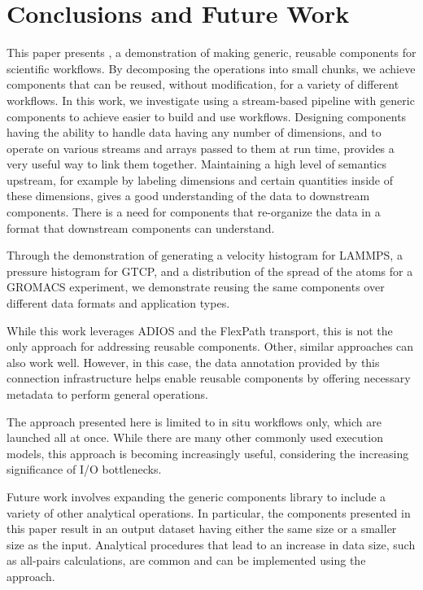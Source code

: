 \section{Conclusions and Future Work}
\label{s:conclusion}

This paper presents \sys, a demonstration of making generic, reusable
components for scientific workflows. By decomposing the operations into small
chunks, we achieve components that can be reused, without modification, for
a variety of different workflows. In this work, we investigate using a
stream-based pipeline with generic components to achieve easier to build and
use workflows. Designing components having the ability to
handle data having any number of dimensions, 
and to operate on various streams and arrays
passed to them at run time,
provides a very useful way to link
them together. Maintaining a high level of semantics upstream, for example by
labeling dimensions and certain quantities inside of these dimensions, gives a
good understanding of the data to downstream components. There is a need for
components that re-organize the data in a format that downstream components can
understand.

Through the demonstration of generating a velocity histogram for LAMMPS,
a pressure histogram for GTCP,
and a distribution of the spread of the atoms for a GROMACS
experiment,
we demonstrate reusing the same components
over different data formats and application types.

While this work leverages ADIOS and the FlexPath transport, this is not the
only approach for addressing reusable components. Other, similar approaches can also work well. However, in this case, the data annotation provided by this
connection infrastructure helps enable reusable components by offering
necessary metadata to perform general operations.

The approach presented here is limited
to in situ workflows only, which are launched
all at once. While there are many other
commonly used execution models, this
approach is becoming increasingly useful,
considering the increasing significance of
I/O bottlenecks.

Future work involves
expanding the generic components library 
to include a variety of other analytical operations.
In particular, the \sys components presented
in this paper
result in an output dataset having either the same
size or a smaller size as the input.
Analytical procedures that lead
to an increase in data size, such as
all-pairs calculations, are common and
can be implemented using the \sys approach.

